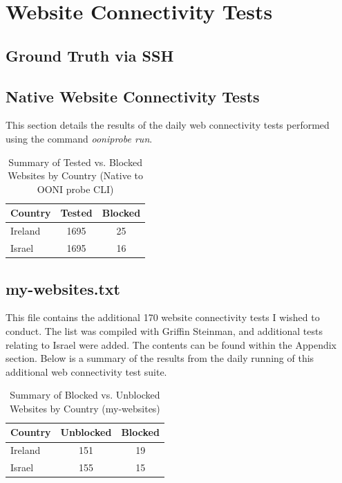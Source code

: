 \section{Website Connectivity Tests}


\subsection{Ground Truth via SSH}
\subsection{Native Website Connectivity Tests}
This section details the results of the daily web connectivity tests performed using the command \textit{ooniprobe run}. 

\begin{table}[H]
\centering
\caption{Summary of Tested vs. Blocked Websites by Country (Native to OONI probe CLI)}
\begin{tabular}{lcc}
\toprule
\textbf{Country} & \textbf{Tested} & \textbf{Blocked} \\
\midrule
Ireland & 1695 & 25 \\
Israel    & 1695 & 16 \\   
\bottomrule
\end{tabular}
\label{tab:blocked_summary}
\end{table}




\subsection{my-websites.txt}
This file contains the additional 170 website connectivity tests I wished to conduct. The list was compiled with Griffin Steinman, and additional tests relating to Israel were added. The contents can be found within the Appendix section. Below is a summary of the results from the daily running of this additional web connectivity test suite.

\begin{table}[H]
\centering
\caption{Summary of Blocked vs. Unblocked Websites by Country (my-websites)}
\begin{tabular}{lcc}
\toprule
\textbf{Country} & \textbf{Unblocked} & \textbf{Blocked} \\
\midrule
Ireland & 151 & 19 \\
Israel    & 155 & 15 \\   
\bottomrule
\end{tabular}
\label{tab:blocked_summary}
\end{table}

